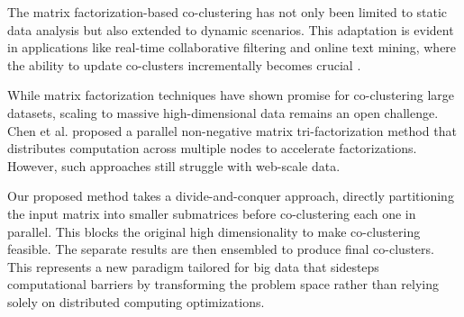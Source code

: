 The matrix factorization-based co-clustering has not only been limited to static data analysis but also extended to dynamic scenarios. This adaptation is evident in applications like real-time collaborative filtering and online text mining, where the ability to update co-clusters incrementally becomes crucial \cite{daruru2009PervasiveParallelismData}.




While matrix factorization techniques have shown promise for co-clustering large datasets, scaling to massive high-dimensional data remains an open challenge. Chen et al. \cite{chen2023ParallelNonNegativeMatrix} proposed a parallel non-negative matrix tri-factorization method that distributes computation across multiple nodes to accelerate factorizations. However, such approaches still struggle with web-scale data.

Our proposed method takes a divide-and-conquer approach, directly partitioning the input matrix into smaller submatrices before co-clustering each one in parallel. This blocks the original high dimensionality to make co-clustering feasible. The separate results are then ensembled to produce final co-clusters. This represents a new paradigm tailored for big data that sidesteps computational barriers by transforming the problem space rather than relying solely on distributed computing optimizations.